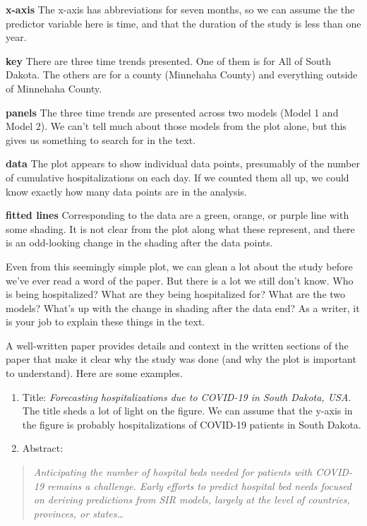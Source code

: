 \documentclass[
]{article}
\begin{document}
\textbf{x-axis} The x-axis has abbreviations for seven months, so we can
assume the the predictor variable here is time, and that the duration of
the study is less than one year.

\textbf{key} There are three time trends presented. One of them is for
All of South Dakota. The others are for a county (Minnehaha County) and
everything outside of Minnehaha County.

\textbf{panels} The three time trends are presented across two models
(Model 1 and Model 2). We can't tell much about those models from the
plot alone, but this gives us something to search for in the text.

\textbf{data} The plot appears to show individual data points,
presumably of the number of cumulative hospitalizations on each day. If
we counted them all up, we could know exactly how many data points are
in the analysis.

\textbf{fitted lines} Corresponding to the data are a green, orange, or
purple line with some shading. It is not clear from the plot along what
these represent, and there is an odd-looking change in the shading after
the data points.

Even from this seemingly simple plot, we can glean a lot about the study
before we've ever read a word of the paper. But there is a lot we still
don't know. Who is being hospitalized? What are they being hospitalized
for? What are the two models? What's up with the change in shading after
the data end? As a writer, it is your job to explain these things in the
text.

A well-written paper provides details and context in the written
sections of the paper that make it clear why the study was done (and why
the plot is important to understand). Here are some examples.

\begin{enumerate}
\def\labelenumi{\arabic{enumi})}
\item
  Title: \emph{Forecasting hospitalizations due to COVID-19 in South
  Dakota, USA.} The title sheds a lot of light on the figure. We can
  assume that the y-axis in the figure is probably hospitalizations of
  COVID-19 patients in South Dakota.
\item
  Abstract:
\end{enumerate}

\begin{quote}
\emph{Anticipating the number of hospital beds needed for patients with
COVID-19 remains a challenge. Early efforts to predict hospital bed
needs focused on deriving predictions from SIR models, largely at the
level of countries, provinces, or states\ldots{}}
\end{quote}
\end{document}
